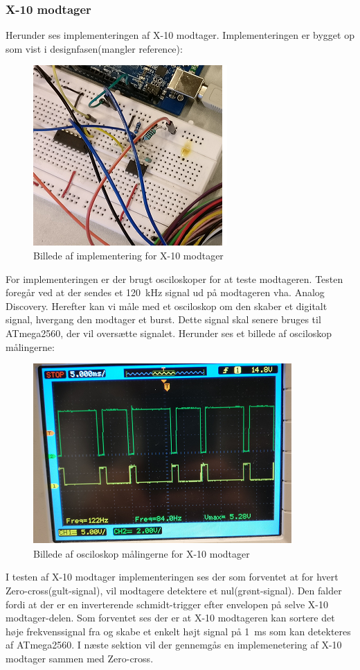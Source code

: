 \documentclass[11pt]{article}
\begin{document}
\subsubsection{X-10 modtager}
Herunder ses implementeringen af X-10 modtager. Implementeringen er bygget op som vist i designfasen(mangler reference):
\begin{figure}[H]
	\centering
	\includegraphics[scale = 1]{X-10modtager-imp}	
	\caption{Billede af implementering for X-10 modtager}
	\label{fig:impX10mod}
\end{figure}
For implementeringen er der brugt osciloskoper for at teste modtageren. Testen foregår ved at der sendes et \SI{120}{\kilo\hertz} signal ud på modtageren vha. Analog Discovery. Herefter kan vi måle med et osciloskop om den skaber et digitalt signal, hvergang den modtager et burst. Dette signal skal senere bruges til ATmega2560, der vil oversætte signalet. Herunder ses et billede af osciloskop målingerne:
\begin{figure}[H]
	\centering
	\includegraphics[scale = 1]{X-10modtager-osc}		
	\caption{Billede af osciloskop målingerne for X-10 modtager}
	\label{bil:oscmodtager}
\end{figure}
I testen af X-10 modtager implementeringen ses der som forventet at for hvert Zero-cross(gult-signal), vil modtagere detektere et nul(grønt-signal). Den falder fordi at der er en inverterende schmidt-trigger efter envelopen på selve X-10 modtager-delen. Som forventet ses der er at X-10 modtageren kan sortere det høje frekvenssignal fra og skabe et enkelt højt signal på \SI{1}{\milli\second} som kan detekteres af ATmega2560. I næste sektion vil der gennemgås en implemenetering af X-10 modtager sammen med Zero-cross.
\end{document}
